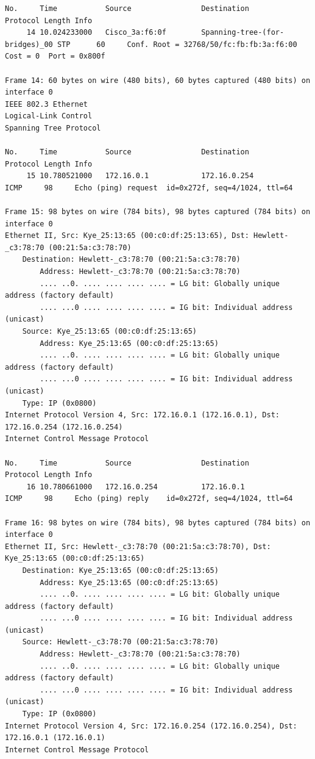 \documentclass[a4paper,11pt]{article}
\begin{document}
\begin{lstlisting}
No.     Time           Source                Destination           Protocol Length Info
     14 10.024233000   Cisco_3a:f6:0f        Spanning-tree-(for-bridges)_00 STP      60     Conf. Root = 32768/50/fc:fb:fb:3a:f6:00  Cost = 0  Port = 0x800f

Frame 14: 60 bytes on wire (480 bits), 60 bytes captured (480 bits) on interface 0
IEEE 802.3 Ethernet 
Logical-Link Control
Spanning Tree Protocol

No.     Time           Source                Destination           Protocol Length Info
     15 10.780521000   172.16.0.1            172.16.0.254          ICMP     98     Echo (ping) request  id=0x272f, seq=4/1024, ttl=64

Frame 15: 98 bytes on wire (784 bits), 98 bytes captured (784 bits) on interface 0
Ethernet II, Src: Kye_25:13:65 (00:c0:df:25:13:65), Dst: Hewlett-_c3:78:70 (00:21:5a:c3:78:70)
    Destination: Hewlett-_c3:78:70 (00:21:5a:c3:78:70)
        Address: Hewlett-_c3:78:70 (00:21:5a:c3:78:70)
        .... ..0. .... .... .... .... = LG bit: Globally unique address (factory default)
        .... ...0 .... .... .... .... = IG bit: Individual address (unicast)
    Source: Kye_25:13:65 (00:c0:df:25:13:65)
        Address: Kye_25:13:65 (00:c0:df:25:13:65)
        .... ..0. .... .... .... .... = LG bit: Globally unique address (factory default)
        .... ...0 .... .... .... .... = IG bit: Individual address (unicast)
    Type: IP (0x0800)
Internet Protocol Version 4, Src: 172.16.0.1 (172.16.0.1), Dst: 172.16.0.254 (172.16.0.254)
Internet Control Message Protocol

No.     Time           Source                Destination           Protocol Length Info
     16 10.780661000   172.16.0.254          172.16.0.1            ICMP     98     Echo (ping) reply    id=0x272f, seq=4/1024, ttl=64

Frame 16: 98 bytes on wire (784 bits), 98 bytes captured (784 bits) on interface 0
Ethernet II, Src: Hewlett-_c3:78:70 (00:21:5a:c3:78:70), Dst: Kye_25:13:65 (00:c0:df:25:13:65)
    Destination: Kye_25:13:65 (00:c0:df:25:13:65)
        Address: Kye_25:13:65 (00:c0:df:25:13:65)
        .... ..0. .... .... .... .... = LG bit: Globally unique address (factory default)
        .... ...0 .... .... .... .... = IG bit: Individual address (unicast)
    Source: Hewlett-_c3:78:70 (00:21:5a:c3:78:70)
        Address: Hewlett-_c3:78:70 (00:21:5a:c3:78:70)
        .... ..0. .... .... .... .... = LG bit: Globally unique address (factory default)
        .... ...0 .... .... .... .... = IG bit: Individual address (unicast)
    Type: IP (0x0800)
Internet Protocol Version 4, Src: 172.16.0.254 (172.16.0.254), Dst: 172.16.0.1 (172.16.0.1)
Internet Control Message Protocol


\end{lstlisting}
\end{document}
